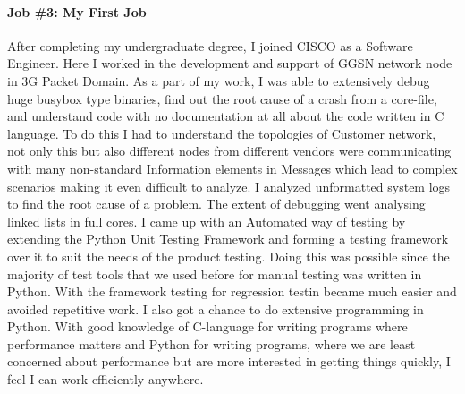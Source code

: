 \documentclass[letterpaper]{article}
\begin{document}
\paragraph{Job \#3: My First Job }
After completing my undergraduate degree, I joined CISCO as a Software Engineer.
Here I worked in the development and support of GGSN network node in 3G Packet Domain. 
As a part of my work, I was able to extensively debug huge busybox type binaries, 
find out the root cause of a crash from a core-file, and understand code with no documentation 
at all about the code written in C language. 
To do this I had to understand the topologies of Customer network, not only this 
but also different nodes from different vendors were communicating with many non-standard 
Information elements in Messages which lead to complex scenarios making it even difficult to analyze. 
I analyzed unformatted system logs to find the root cause of a problem. 
The extent of debugging went analysing linked lists in full cores. 
I came up with an Automated way of testing by extending the Python Unit Testing Framework and forming 
a testing framework over it to suit the needs of the product testing. 
Doing this was possible since the majority of test tools that we used before for manual testing was written in Python. 
With the framework testing for regression testin became much easier and avoided repetitive work. 
I also got a chance to do extensive programming in Python. 
With good knowledge of C-language for writing programs where performance matters and Python for writing programs, 
where we are least concerned about performance but are more interested in getting things quickly, 
I feel I can work efficiently anywhere. 
\end{document}
